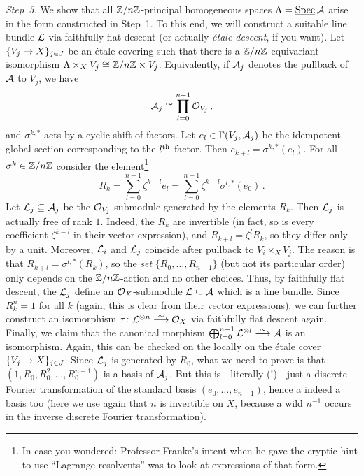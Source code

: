 \begin{proof*}
	\emph{Step~3.} We show that all $\mathbb{Z}/n\mathbb{Z}$-principal homogeneous spaces $\Lambda=\operatorname{\underline{\smash{\mathrm{Spec}}}}\mathcal{A}$ arise in the form constructed in Step~1. To this end, we will construct a suitable line bundle $\mathcal{L}$ via faithfully flat descent (or actually \emph{étale descent}, if you want). Let $\{V_j\morphism X\}_{j\in J}$ be an étale covering such that there is a $\mathbb{Z}/n\mathbb{Z}$-equivariant isomorphism $\Lambda\times_XV_j\cong \mathbb{Z}/n\mathbb{Z}\times V_j$. Equivalently, if $\mathcal{A}_j$ denotes the pullback of $\mathcal{A}$ to $V_j$, we have
	\begin{equation*}
		\mathcal{A}_j\cong \prod_{l=0}^{n-1}\mathcal{O}_{V_j}\,,
	\end{equation*}
	and $\sigma^{k,*}$ acts by a cyclic shift of factors. Let $e_l\in \operatorname{\Gamma}(V_j,\mathcal{A}_j)$ be the idempotent global section corresponding to the $l^{\text{th}}$ factor. Then $e_{k+l}=\sigma^{k,*}(e_l)$. For all $\sigma^k\in \mathbb{Z}/n\mathbb{Z}$ consider the element\footnote{In case you wondered: Professor Franke's intent when he gave the cryptic hint to use \enquote{Lagrange resolvents} was to look at expressions of that form.}
	\begin{equation*}
		R_k=\sum_{l=0}^{n-1}\zeta^{k-l}e_l=\sum_{l=0}^{n-1}\zeta^{k-l}\sigma^{l,*}(e_0)\,.
	\end{equation*}
	Let $\mathcal{L}_j\subseteq \mathcal{A}_j$ be the $\mathcal{O}_{V_j}$-submodule generated by the elements $R_k$. Then $\mathcal{L}_j$ is actually free of rank $1$. Indeed, the $R_k$ are invertible (in fact, so is every coefficient $\zeta^{k-l}$ in their vector expression), and $R_{k+l}=\zeta^lR_k$, so they differ only by a unit. Moreover, $\mathcal{L}_i$ and $\mathcal{L}_j$ coincide after pullback to $V_i\times_XV_j$. The reason is that $R_{k+l}=\sigma^{l,*}(R_k)$, so the \emph{set} $\{R_0,\dotsc, R_{n-1}\}$ (but not its particular order) only depends on the $\mathbb{Z}/n\mathbb{Z}$-action and no other choices. Thus, by faithfully flat descent, the $\mathcal{L}_j$ define an $\mathcal{O}_X$-submodule $\mathcal{L}\subseteq \mathcal{A}$ which is a line bundle. Since $R_k^n=1$ for all $k$ (again, this is clear from their vector expressions), we can further construct an isomorphism  $\tau\colon\Ll^{\otimes n}\isomorphism \Oo_X$ via faithfully flat descent again. Finally, we claim that the canonical morphism $\bigoplus_{l=0}^{n-1}\Ll^{\otimes l}\isomorphism \Aa$ is an isomorphism. Again, this can be checked on the locally on the étale cover $\{V_j\morphism X\}_{j\in J}$. Since $\mathcal{L}_j$ is generated by $R_0$, what we need to prove is that $(1,R_0,R_0^2,\dotsc,R_0^{n-1})$ is a basis of $\mathcal{A}_j$. But this is---literally (!)---just a discrete Fourier transformation of the standard basis $(e_0,\dotsc,e_{n-1})$, hence a indeed a basis too (here we use again that $n$ is invertible on $X$, because a wild $n^{-1}$ occurs in the inverse discrete Fourier transformation).
	

\end{proof*}
